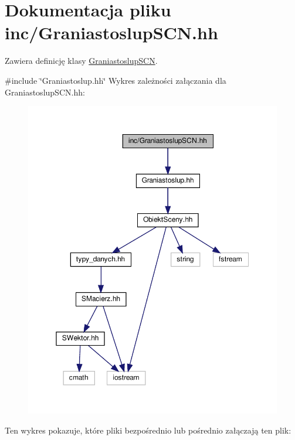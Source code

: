 \hypertarget{GraniastoslupSCN_8hh}{}\section{Dokumentacja pliku inc/\+Graniastoslup\+S\+CN.hh}
\label{GraniastoslupSCN_8hh}


Zawiera definicję klasy \hyperlink{classGraniastoslupSCN}{Graniastoslup\+S\+CN}.  


{\ttfamily \#include \char`\"{}Graniastoslup.\+hh\char`\"{}}\newline
Wykres zależności załączania dla Graniastoslup\+S\+C\+N.\+hh\+:\nopagebreak
\begin{figure}[H]
\begin{center}
\leavevmode
\includegraphics[width=350pt]{GraniastoslupSCN_8hh__incl}
\end{center}
\end{figure}
Ten wykres pokazuje, które pliki bezpośrednio lub pośrednio załączają ten plik\+:\nopagebreak
